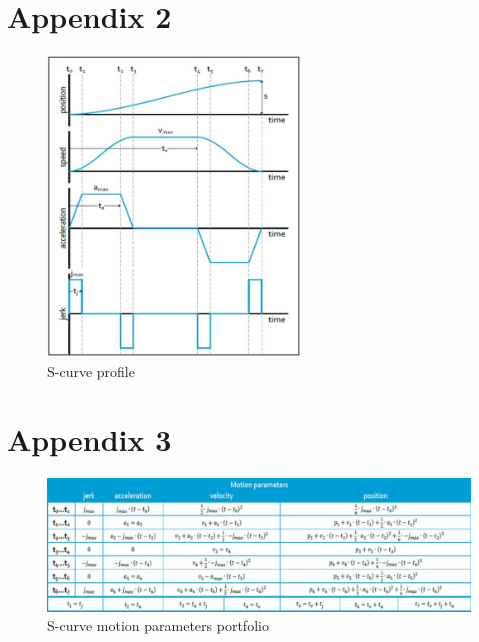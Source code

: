\documentclass[10pt, letterpaper]{article}
\begin{document}
\section*{Appendix 2}
    \begin{figure}[h]
        \centering
        \includegraphics[width=0.6\textwidth]{appendix2.JPG}
        \caption*{S-curve profile}
    \end{figure}

\section*{Appendix 3}
    \begin{figure}[h]
        \centering
        \includegraphics[width=\textwidth]{appendix3.JPG}
        \caption*{S-curve motion parameters portfolio}
    \end{figure}
\pagebreak
\end{document}
